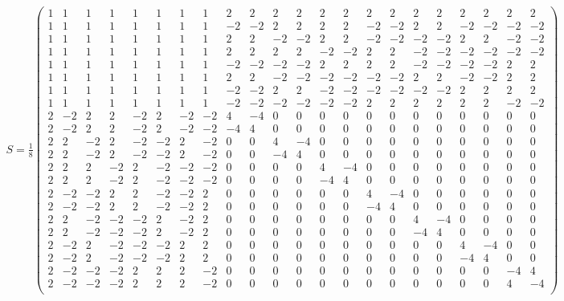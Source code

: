 \documentclass[nofootinbib,pra,twocolumn,showpacs,superscriptaddress,notitlepage,amsmath]{revtex4-2} %
\begin{document}
\begin{align}
S=\frac{1}{8}
\begin{pmatrix}
 1 & 1 & 1 & 1 & 1 & 1 & 1 & 1 & 2 & 2 & 2 & 2 & 2 & 2 & 2 & 2 & 2 & 2 & 2 & 2 & 2 & 2 \\
 1 & 1 & 1 & 1 & 1 & 1 & 1 & 1 & -2 & -2 & 2 & 2 & 2 & 2 & -2 & -2 & 2 & 2 & -2 & -2 & -2 & -2 \\
 1 & 1 & 1 & 1 & 1 & 1 & 1 & 1 & 2 & 2 & -2 & -2 & 2 & 2 & -2 & -2 & -2 & -2 & 2 & 2 & -2 & -2 \\
 1 & 1 & 1 & 1 & 1 & 1 & 1 & 1 & 2 & 2 & 2 & 2 & -2 & -2 & 2 & 2 & -2 & -2 & -2 & -2 & -2 & -2 \\
 1 & 1 & 1 & 1 & 1 & 1 & 1 & 1 & -2 & -2 & -2 & -2 & 2 & 2 & 2 & 2 & -2 & -2 & -2 & -2 & 2 & 2 \\
 1 & 1 & 1 & 1 & 1 & 1 & 1 & 1 & 2 & 2 & -2 & -2 & -2 & -2 & -2 & -2 & 2 & 2 & -2 & -2 & 2 & 2 \\
 1 & 1 & 1 & 1 & 1 & 1 & 1 & 1 & -2 & -2 & 2 & 2 & -2 & -2 & -2 & -2 & -2 & -2 & 2 & 2 & 2 & 2 \\
 1 & 1 & 1 & 1 & 1 & 1 & 1 & 1 & -2 & -2 & -2 & -2 & -2 & -2 & 2 & 2 & 2 & 2 & 2 & 2 & -2 & -2 \\
 2 & -2 & 2 & 2 & -2 & 2 & -2 & -2 & 4 & -4 & 0 & 0 & 0 & 0 & 0 & 0 & 0 & 0 & 0 & 0 & 0 & 0 \\
 2 & -2 & 2 & 2 & -2 & 2 & -2 & -2 & -4 & 4 & 0 & 0 & 0 & 0 & 0 & 0 & 0 & 0 & 0 & 0 & 0 & 0 \\
 2 & 2 & -2 & 2 & -2 & -2 & 2 & -2 & 0 & 0 & 4 & -4 & 0 & 0 & 0 & 0 & 0 & 0 & 0 & 0 & 0 & 0 \\
 2 & 2 & -2 & 2 & -2 & -2 & 2 & -2 & 0 & 0 & -4 & 4 & 0 & 0 & 0 & 0 & 0 & 0 & 0 & 0 & 0 & 0 \\
 2 & 2 & 2 & -2 & 2 & -2 & -2 & -2 & 0 & 0 & 0 & 0 & 4 & -4 & 0 & 0 & 0 & 0 & 0 & 0 & 0 & 0 \\
 2 & 2 & 2 & -2 & 2 & -2 & -2 & -2 & 0 & 0 & 0 & 0 & -4 & 4 & 0 & 0 & 0 & 0 & 0 & 0 & 0 & 0 \\
 2 & -2 & -2 & 2 & 2 & -2 & -2 & 2 & 0 & 0 & 0 & 0 & 0 & 0 & 4 & -4 & 0 & 0 & 0 & 0 & 0 & 0 \\
 2 & -2 & -2 & 2 & 2 & -2 & -2 & 2 & 0 & 0 & 0 & 0 & 0 & 0 & -4 & 4 & 0 & 0 & 0 & 0 & 0 & 0 \\
 2 & 2 & -2 & -2 & -2 & 2 & -2 & 2 & 0 & 0 & 0 & 0 & 0 & 0 & 0 & 0 & 4 & -4 & 0 & 0 & 0 & 0 \\
 2 & 2 & -2 & -2 & -2 & 2 & -2 & 2 & 0 & 0 & 0 & 0 & 0 & 0 & 0 & 0 & -4 & 4 & 0 & 0 & 0 & 0 \\
 2 & -2 & 2 & -2 & -2 & -2 & 2 & 2 & 0 & 0 & 0 & 0 & 0 & 0 & 0 & 0 & 0 & 0 & 4 & -4 & 0 & 0 \\
 2 & -2 & 2 & -2 & -2 & -2 & 2 & 2 & 0 & 0 & 0 & 0 & 0 & 0 & 0 & 0 & 0 & 0 & -4 & 4 & 0 & 0 \\
 2 & -2 & -2 & -2 & 2 & 2 & 2 & -2 & 0 & 0 & 0 & 0 & 0 & 0 & 0 & 0 & 0 & 0 & 0 & 0 & -4 & 4 \\
 2 & -2 & -2 & -2 & 2 & 2 & 2 & -2 & 0 & 0 & 0 & 0 & 0 & 0 & 0 & 0 & 0 & 0 & 0 & 0 & 4 & -4 \\
\end{pmatrix} 
\end{align}
\end{document}
